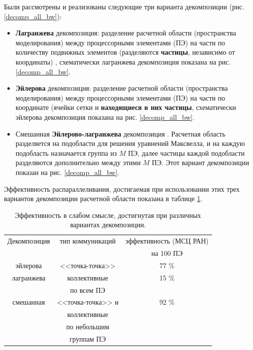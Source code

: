 Были рассмотрены и реализованы следующие три варианта декомпозиции (рис. \ref{decomp_all_bw}):

\begin{itemize}
\item \textbf{Лагранжева} декомпозиция: разделение расчетной области (пространства моделирования) между процессорными элементами (ПЭ) на части по количеству подвижных элементов
(разделяются \textbf{частицы}, независимо от координаты) , схематически лагранжева декомпозиция показана на рис. \ref{decomp_all_bw}.

\item \textbf{Эйлерова} декомпозиция: разделение расчетной области (пространства моделирования) между процессорными элементами (ПЭ) на части по координате (ячейки сетки и \textbf{находящиеся в них частицы}, схематически эйлерова декомпозиция показана на рис. \ref{decomp_all_bw}.

\item Смешанная \textbf{Эйлерово-лагранжева} декомпозиция \cite{VychMethProgExa}. Расчетная область разделяется на подобласти для решения уравнений Максвелла, и на каждую подобласть назначается группа из $M$ ПЭ, далее частицы каждой подобласти разделяются дополнительно между этими $M$ ПЭ. Этот вариант декомпозиции показан на рис. \ref{decomp_all_bw}.

\end{itemize}

Эффективность распараллеливания, достигаемая при использовании  этих трех вариантов декомпозиции расчетной области показана в таблице \ref{effcompare}. 



\begin{table}[ht]
\caption{Эффективность в слабом смысле, достигнутая при различных вариантах декомпозиции.}
\begin{center}

\begin{tabular}{|c|c|c|}
\hline
Декомпозиция & тип коммуникаций        &  эффективность (МСЦ РАН) \\
             &                         &  на 100 ПЭ\\ \hline
эйлерова     & <<точка-точка>>         &   77 \%  \\ \hline
 лагранжева  & коллективные            &   15 \%  \\
             &  по всем ПЭ             &        \\ \hline
 смешанная   & <<точка-точка>> и       &   92 \%  \\ 
             & коллективные            &       \\
             & по небольшим            &        \\ 
             & группам ПЭ              &      \\ \hline 
\end{tabular}
\end{center}
\label{effcompare}
\end{table}





